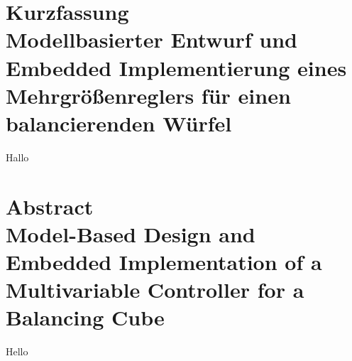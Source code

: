 
\section*{Kurzfassung\\Modellbasierter Entwurf und Embedded Implementierung eines Mehrgrößenreglers für einen balancierenden Würfel} \label{Kurzfassung}
Hallo

\newpage

\section*{Abstract\\Model-Based Design and Embedded Implementation of a Multivariable Controller for a Balancing Cube} \label{Abstract}
Hello


\cleardoublepage